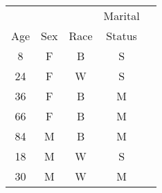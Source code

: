 \begin{tabular}{ccccc}
     &     &      & Marital \\
 Age & Sex & Race & Status \\
 8  & F  & B   & S  \\
 24  & F  & W   & S  \\
 36  & F  & B   & M  \\
 66  & F  & B   & M  \\
 84  & M  & B   & M  \\
 18  & M  & W   & S  \\
 30  & M  & W   & M  \\
\hline
\end{tabular}
